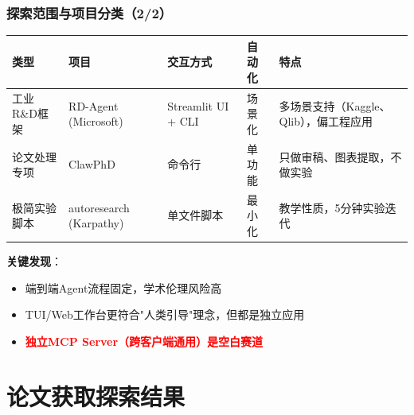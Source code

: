 \documentclass[
  aspectratio=169,
  presentation,
  titlegraphic=./images/bit_logo.pdf,
  framelogo=./images/bit_logo.pdf
]{bitbeamer}
\begin{document}
\begin{frame}[t]
  \frametitle{探索范围与项目分类（2/2）}

  \begin{table}
    \centering
    \tiny
    \begin{tabular}{p{2.5cm}p{4cm}p{2cm}p{1.5cm}p{3cm}}
      \toprule
      \textbf{类型} & \textbf{项目} & \textbf{交互方式} & \textbf{自动化} & \textbf{特点} \\
      \midrule
      工业R\&D框架 & RD-Agent (Microsoft) & Streamlit UI + CLI & 场景化 & 多场景支持（Kaggle、Qlib），偏工程应用 \\
      \midrule
      论文处理专项 & ClawPhD & 命令行 & 单功能 & 只做审稿、图表提取，不做实验 \\
      \midrule
      极简实验脚本 & autoresearch (Karpathy) & 单文件脚本 & 最小化 & 教学性质，5分钟实验迭代 \\
      \bottomrule
    \end{tabular}
  \end{table}

  \vspace{0.5cm}

  \textbf{关键发现}：
  \begin{itemize}
    \item 端到端Agent流程固定，学术伦理风险高
    \item TUI/Web工作台更符合"人类引导"理念，但都是独立应用
    \item \textcolor{red}{\textbf{独立MCP Server（跨客户端通用）是空白赛道}}
  \end{itemize}

\end{frame}

\section{论文获取探索结果}
\end{document}
